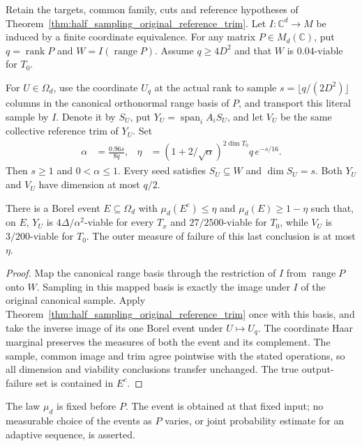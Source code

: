 \begin{theorem}
    \label{thm:rank_product_half_sample_reference_trim}
    \leanok
    Retain the targets, common family, cuts and reference hypotheses of
    Theorem~\ref{thm:half_sampling_original_reference_trim}. Let
    $I:\mathbb C^d\to M$ be induced by a finite coordinate equivalence.
    For any matrix $P\in M_d(\mathbb C)$, put
    $q=\operatorname{rank}P$ and $W=I(\operatorname{range}P)$.
    Assume $q\ge4D^2$ and that $W$ is $0.04$-viable for $T_0$.

    For $U\in\Omega_d$, use the coordinate $U_q$ at the actual rank to sample
    $s=\lfloor q/(2D^2)\rfloor$ columns in the canonical orthonormal range
    basis of $P$, and transport this literal sample by $I$. Denote it by
    $S_U$, put $Y_U=\operatorname{span}_iA_iS_U$, and let $V_U$ be the
    same collective reference trim of $Y_U$. Set
    \begin{align}
        \alpha & =\frac{0.96s}{8q},                          &
        \eta   & =(1+2/\sqrt\alpha)^{2\dim T_0}q\,e^{-s/16}.
    \end{align}
    Then $s\ge1$ and $0<\alpha\le1$. Every seed satisfies
    $S_U\subseteq W$ and $\dim S_U=s$. Both $Y_U$ and $V_U$ have
    dimension at most $q/2$.

    There is a Borel event $E\subseteq\Omega_d$ with
    $\mu_d(E^c)\le\eta$ and $\mu_d(E)\ge1-\eta$ such that, on $E$,
    $Y_U$ is $4\Delta/\alpha^2$-viable for every $T_x$ and
    $27/2500$-viable for $T_0$, while $V_U$ is $3/200$-viable for $T_0$.
    The outer measure of failure of this last conclusion is at most $\eta$.
\end{theorem}
\begin{proof}\leanok
    Map the canonical range basis through the restriction of $I$ from
    $\operatorname{range}P$ onto $W$. Sampling in this mapped basis is
    exactly the image under $I$ of the original canonical sample.
    Apply Theorem~\ref{thm:half_sampling_original_reference_trim} once
    with this basis, and take the inverse image of its one Borel event
    under $U\mapsto U_q$. The coordinate Haar marginal preserves the
    measures of both the event and its complement. The sample, common
    image and trim agree pointwise with the stated operations, so all
    dimension and viability conclusions transfer unchanged. The true
    output-failure set is contained in $E^c$.
\end{proof}

The law $\mu_d$ is fixed before $P$. The event is obtained at that fixed
input; no measurable choice of the events as $P$ varies, or joint
probability estimate for an adaptive sequence, is asserted.
